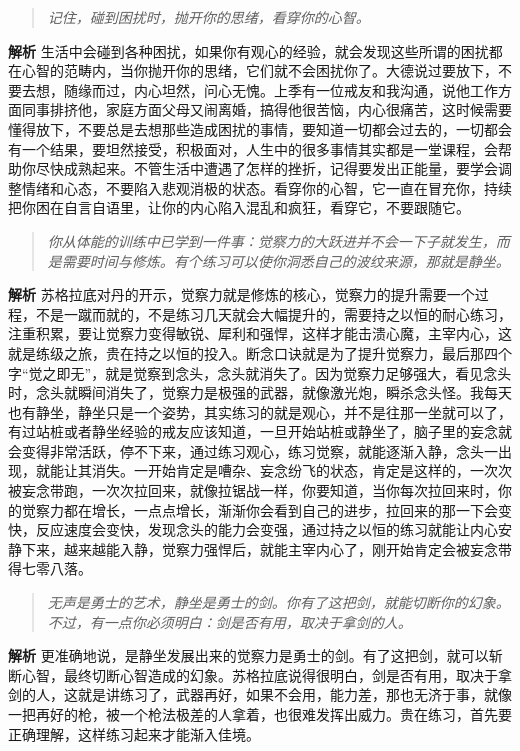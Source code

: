 \begin{quote}\it
    记住，碰到困扰时，抛开你的思绪，看穿你的心智。
\end{quote}

\textbf{解析} 生活中会碰到各种困扰，如果你有观心的经验，就会发现这些所谓的困扰都在心智的范畴内，当你抛开你的思绪，它们就不会困扰你了。大德说过要放下，不要去想，随缘而过，内心坦然，问心无愧。上季有一位戒友和我沟通，说他工作方面同事排挤他，家庭方面父母又闹离婚，搞得他很苦恼，内心很痛苦，这时候需要懂得放下，不要总是去想那些造成困扰的事情，要知道一切都会过去的，一切都会有一个结果，要坦然接受，积极面对，人生中的很多事情其实都是一堂课程，会帮助你尽快成熟起来。不管生活中遭遇了怎样的挫折，记得要发出正能量，要学会调整情绪和心态，不要陷入悲观消极的状态。看穿你的心智，它一直在冒充你，持续把你困在自言自语里，让你的内心陷入混乱和疯狂，看穿它，不要跟随它。

\begin{quote}\it
    你从体能的训练中已学到一件事：觉察力的大跃进并不会一下子就发生，而是需要时间与修炼。有个练习可以使你洞悉自己的波纹来源，那就是静坐。
\end{quote}

\textbf{解析} 苏格拉底对丹的开示，觉察力就是修炼的核心，觉察力的提升需要一个过程，不是一蹴而就的，不是练习几天就会大幅提升的，需要持之以恒的耐心练习，注重积累，要让觉察力变得敏锐、犀利和强悍，这样才能击溃心魔，主宰内心，这就是练级之旅，贵在持之以恒的投入。断念口诀就是为了提升觉察力，最后那四个字“觉之即无”，就是觉察到念头，念头就消失了。因为觉察力足够强大，看见念头时，念头就瞬间消失了，觉察力是极强的武器，就像激光炮，瞬杀念头怪。我每天也有静坐，静坐只是一个姿势，其实练习的就是观心，并不是往那一坐就可以了，有过站桩或者静坐经验的戒友应该知道，一旦开始站桩或静坐了，脑子里的妄念就会变得非常活跃，停不下来，通过练习观心，练习觉察，就能逐渐入静，念头一出现，就能让其消失。一开始肯定是嘈杂、妄念纷飞的状态，肯定是这样的，一次次被妄念带跑，一次次拉回来，就像拉锯战一样，你要知道，当你每次拉回来时，你的觉察力都在增长，一点点增长，渐渐你会看到自己的进步，拉回来的那一下会变快，反应速度会变快，发现念头的能力会变强，通过持之以恒的练习就能让内心安静下来，越来越能入静，觉察力强悍后，就能主宰内心了，刚开始肯定会被妄念带得七零八落。

\begin{quote}\it
    无声是勇士的艺术，静坐是勇士的剑。你有了这把剑，就能切断你的幻象。不过，有一点你必须明白：剑是否有用，取决于拿剑的人。
\end{quote}

\textbf{解析} 更准确地说，是静坐发展出来的觉察力是勇士的剑。有了这把剑，就可以斩断心智，最终切断心智造成的幻象。苏格拉底说得很明白，剑是否有用，取决于拿剑的人，这就是讲练习了，武器再好，如果不会用，能力差，那也无济于事，就像一把再好的枪，被一个枪法极差的人拿着，也很难发挥出威力。贵在练习，首先要正确理解，这样练习起来才能渐入佳境。

